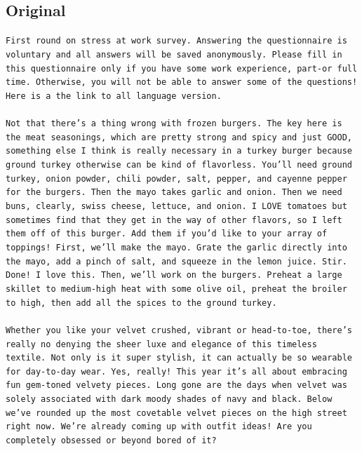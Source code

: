 \documentclass[table]{article}
\begin{document}
\subsection*{Original}
\begin{tcolorbox}[colback=gray!20, colframe=gray!75, rounded corners, sharp corners=northeast, sharp corners=southwest]
\texttt{First round on stress at work survey. Answering the questionnaire is voluntary and all answers will be saved anonymously. Please fill in this questionnaire only if you have some work experience, part-or full time. Otherwise, you will not be able to answer some of the questions! Here is a the link to all language version.\\\\
Not that there's a thing wrong with frozen burgers. The key here is the meat seasonings, which are pretty strong and spicy and just GOOD, something else I think is really necessary in a turkey burger because ground turkey otherwise can be kind of flavorless. You'll need ground turkey, onion powder, chili powder, salt, pepper, and cayenne pepper for the burgers. Then the mayo takes garlic and onion. Then we need buns, clearly, swiss cheese, lettuce, and onion. I LOVE tomatoes but sometimes find that they get in the way of other flavors, so I left them off of this burger. Add them if you'd like to your array of toppings! First, we'll make the mayo. Grate the garlic directly into the mayo, add a pinch of salt, and squeeze in the lemon juice. Stir. Done! I love this. Then, we'll work on the burgers. Preheat a large skillet to medium-high heat with some olive oil, preheat the broiler to high, then add all the spices to the ground turkey.\\\\
Whether you like your velvet crushed, vibrant or head-to-toe, there's really no denying the sheer luxe and elegance of this timeless textile. Not only is it super stylish, it can actually be so wearable for day-to-day wear. Yes, really! This year it's all about embracing fun gem-toned velvety pieces. Long gone are the days when velvet was solely associated with dark moody shades of navy and black. Below we've rounded up the most covetable velvet pieces on the high street right now. We're already coming up with outfit ideas! Are you completely obsessed or beyond bored of it?\\\\
}
\end{tcolorbox}
\end{document}
